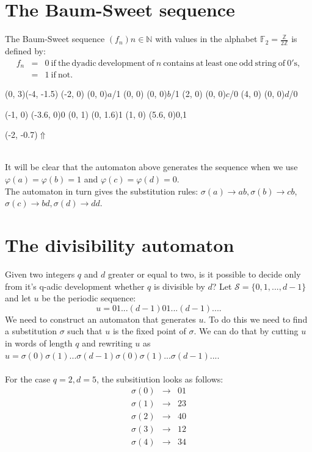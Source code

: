 \documentclass{article}
\begin{document}
\section*{The Baum-Sweet sequence}
The Baum-Sweet sequence $(f_n)n \in \mathbb{N}$ with values in the alphabet 
$\mathbb{F}_2 = \frac{\mathbb{Z}}{2 \mathbb{Z}}$ is defined by:
\begin{eqnarray*}
f_n &=& 0 \mathrm{\ if\ the\ dyadic\ development\ of\ } n 
          \mathrm{\ contains\ at\ least\ one\ odd\ string\ of\ 0's},\\
    &=& 1 \mathrm{\ if\ not.}
\end{eqnarray*}
\begin{graph}(0, 3)(-4, -1.5)
  (-2, 0) (0, 0){$a$/1}
  (0, 0)  (0, 0){$b$/1}
  (2, 0)  (0, 0){$c$/0}
  (4, 0)  (0, 0){$d$/0}

  (-1, 0) \freetext(-3.6, 0){0}
   
   
  (0, 1) \freetext(0, 1.6){1}
   
   
  (1, 0) \freetext(5.6, 0){0,1}
  
  \freetext(-2, -0.7){$\Uparrow$}
\end{graph}\\
It will be clear that the automaton above generates the sequence when we use
$\varphi(a) = \varphi(b) = 1$ and $\varphi(c) = \varphi(d) = 0$.\\
The automaton in turn gives the substitution rules: 
$\sigma(a) \rightarrow ab, \sigma(b) \rightarrow cb$,
$\sigma(c) \rightarrow bd, \sigma(d) \rightarrow dd$.

\section*{The divisibility automaton}
Given two integers $q$ and $d$ greater or equal to two, is it possible to 
decide only from it's q-adic development whether $q$ is divisible by $d$?
Let $\mathcal{S} = \{0, 1, ..., d - 1\}$ and let $u$ be the periodic sequence:
\begin{displaymath}
  u = 01...(d - 1)01...(d - 1)... .
\end{displaymath}
We need to construct an automaton that generates $u$. To do this we need to
find a substitution $\sigma$ such that $u$ is the fixed point of $\sigma$. 
We can do that by cutting $u$ in words of length $q$ and rewriting $u$ as
$u = \sigma(0)\sigma(1)...\sigma(d - 1)\sigma(0)\sigma(1)...\sigma(d - 1)...$.\\
\\
For the case $q = 2, d = 5$, the subsitiution looks as follows:
\begin{eqnarray*}
  \sigma(0) &\rightarrow& 01 \\
  \sigma(1) &\rightarrow& 23 \\
  \sigma(2) &\rightarrow& 40 \\
  \sigma(3) &\rightarrow& 12 \\
  \sigma(4) &\rightarrow& 34
\end{eqnarray*}
\end{document}
